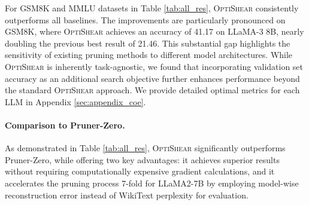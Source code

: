 For GSM8K and MMLU datasets in Table \ref{tab:all_res}, \textsc{OptiShear} consistently outperforms all baselines. The improvements are particularly pronounced on GSM8K, where \textsc{OptiShear} achieves an accuracy of 41.17 on LLaMA-3 8B, nearly doubling the previous best result of 21.46. This substantial gap highlights the sensitivity of existing pruning methods to different model architectures. While \textsc{OptiShear} is inherently task-agnostic, we found that incorporating validation set accuracy as an additional search objective further enhances performance beyond the standard \textsc{OptiShear} approach. We provide detailed optimal metrics for each LLM  in Appendix \ref{sec:appendix_coe}.

\paragraph{Comparison to Pruner-Zero.}
As demonstrated in Table \ref{tab:all_res}, \textsc{OptiShear} significantly outperforms Pruner-Zero, while offering two key advantages: it achieves superior results without requiring computationally expensive gradient calculations, and it accelerates the pruning process 7-fold for LLaMA2-7B by employing model-wise reconstruction error instead of WikiText perplexity for evaluation.

\vspace{-0.2cm}
